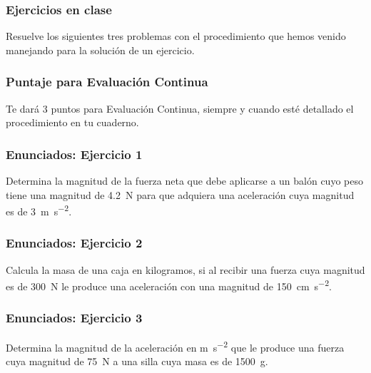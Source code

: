 \documentclass[14pt]{beamer}
\begin{document}
\begin{frame}
\frametitle{Ejercicios en clase}
Resuelve los siguientes tres problemas con el procedimiento que hemos venido manejando para la solución de un ejercicio.
\end{frame}
\begin{frame}
\frametitle{Puntaje para Evaluación Continua}
Te dará 3 puntos para Evaluación Continua, siempre y cuando esté detallado el procedimiento en tu cuaderno.
\end{frame}
\begin{frame}
\frametitle{Enunciados: Ejercicio 1}
Determina la magnitud de la fuerza neta que debe aplicarse a un balón cuyo peso tiene una magnitud de
\SI{4.2}{\newton} para que adquiera una aceleración cuya magnitud es de \SI{3}{\meter\per\square\second}.
\end{frame}
\begin{frame}
\frametitle{Enunciados: Ejercicio 2}
Calcula la masa de una caja en kilogramos, si al recibir una fuerza cuya magnitud es de \SI{300}{\newton} le produce una aceleración con una magnitud de \SI{150}{\centi\meter\per\square\second}.
\end{frame}
\begin{frame}
\frametitle{Enunciados: Ejercicio 3}
Determina la magnitud de la aceleración en \si{\meter\per\square\second} que le produce una fuerza cuya magnitud de \SI{75}{\newton} a una silla cuya masa es de \SI{1500}{\gram}.
\end{frame}

\end{document}
